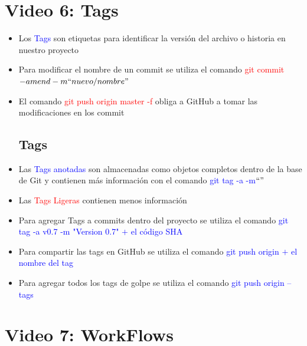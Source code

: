 \documentclass{article}
\begin{document}
	
	\section{Video 6: Tags}
	
	\begin{itemize}
		\item Los \textcolor{blue}{Tags} son etiquetas para identificar la versión del archivo o historia en nuestro proyecto
		\item Para modificar el nombre de un commit se utiliza el comando \textcolor{red}{git commit $-amend -m ``nuevo/ nombre"$}
		\item El comando \textcolor{red}{git push origin master -f} obliga a GitHub a tomar las modificaciones en los commit
		\subsection{Tags}
		\item Las \textcolor{blue}{Tags anotadas} son almacenadas como objetos completos dentro de la base de Git y contienen más información con el comando \textcolor{blue}{git tag -a -m$``"$}
		\item Las \textcolor{red}{Tags Ligeras} contienen menos información
		\item Para agregar Tags a commits dentro del proyecto se utiliza el comando \textcolor{blue}{git tag -a v0.7 -m "Version 0.7" $+$ el código SHA}
		\item Para compartir las tags en GitHub se utiliza el comando \textcolor{blue}{git push origin $+$ el nombre del tag}
		\item Para agregar todos los tags de golpe se utiliza el comando \textcolor{blue}{git push origin --tags}
	\end{itemize}

	\section{Video 7: WorkFlows}
	
\end{document}
